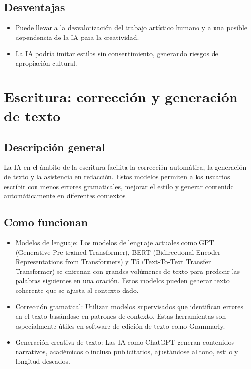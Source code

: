 \documentclass[12pt]{article}
\begin{document}
\subsection{Desventajas}
\begin{itemize}
    \item Puede llevar a la desvalorización del trabajo artístico humano y a una posible dependencia de la IA para la creatividad.
    \item La IA podría imitar estilos sin consentimiento, generando riesgos de apropiación cultural.
\end{itemize}

\section{Escritura: corrección y generación de texto}
\subsection{Descripción general}
La IA en el ámbito de la escritura facilita la corrección automática, la generación de texto y la asistencia en redacción. 
Estos modelos permiten a los usuarios escribir con menos errores gramaticales, mejorar el estilo y generar contenido automáticamente 
en diferentes contextos.

\subsection{Como funcionan}
\begin{itemize}
    \item Modelos de lenguaje: 
    Los modelos de lenguaje actuales como GPT (Generative Pre-trained Transformer), BERT (Bidirectional Encoder Representations from Transformers)
    y T5 (Text-To-Text Transfer Transformer) se entrenan con grandes volúmenes de texto para predecir las palabras siguientes en una oración. 
    Estos modelos pueden generar texto coherente que se ajusta al contexto dado.
    \item Corrección gramatical:
    Utilizan modelos supervisados que identifican errores en el texto basándose en patrones de contexto. Estas herramientas son especialmente 
    útiles en software de edición de texto como Grammarly.
    \item Generación creativa de texto:
    Las IA como ChatGPT generan contenidos narrativos, académicos o incluso publicitarios, ajustándose al tono, estilo y longitud deseados.
\end{itemize}
\end{document}
